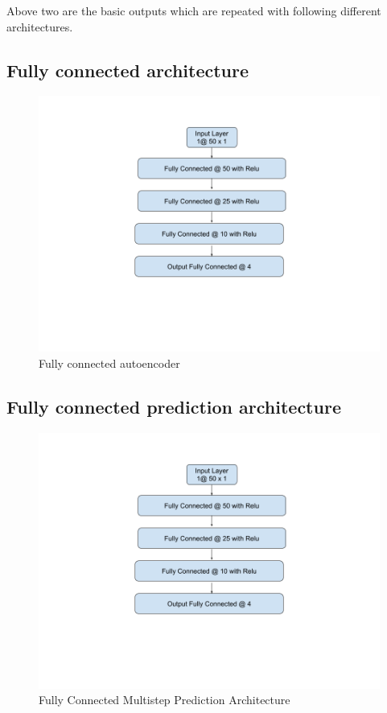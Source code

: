 \documentclass[12pt]{article}
\begin{document}
Above two are the basic outputs which are repeated with following different architectures.
\subsection{Fully connected architecture}
\begin{figure}[H]
\centering
        \includegraphics[width=\textwidth]{images/architecture/NnMultistepAheadPrediction.png}
    \caption{Fully connected autoencoder}
    \label{generalAnomalyDetectionFrameWork}
\end{figure}
\subsection{Fully connected prediction architecture}
\begin{figure}[H]
\centering
        \includegraphics[width=\textwidth]{images/architecture/NnMultistepAheadPrediction.png}
    \caption{Fully Connected Multistep Prediction Architecture}
    \label{generalAnomalyDetectionFrameWork}
\end{figure}
\end{document}
